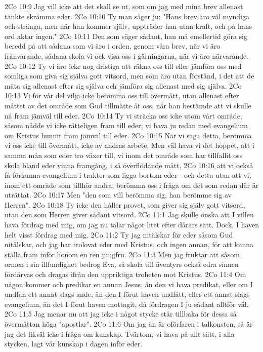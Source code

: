 2Co 10:9  Jag vill icke att det skall se ut, som om jag med mina brev allenast tänkte skrämma eder.
2Co 10:10  Ty man säger ju: "Hans brev äro väl myndiga och stränga, men när han kommer själv, uppträder han utan kraft, och på hans ord aktar ingen."
2Co 10:11  Den som säger sådant, han må emellertid göra sig beredd på att sådana som vi äro i orden, genom våra brev, när vi äro frånvarande, sådana skola vi ock visa oss i gärningarna, när vi äro närvarande.
2Co 10:12  Ty vi äro icke nog dristiga att räkna oss till eller jämföra oss med somliga som giva sig själva gott vitsord, men som äro utan förstånd, i det att de mäta sig allenast efter sig själva och jämföra sig allenast med sig själva.
2Co 10:13  Vi för vår del vilja icke berömma oss till övermått, utan allenast efter måttet av det område som Gud tillmätte åt oss, när han bestämde att vi skulle nå fram jämväl till eder.
2Co 10:14  Ty vi sträcka oss icke utom vårt område, såsom nådde vi icke rätteligen fram till eder; vi hava ju redan med evangelium om Kristus hunnit fram jämväl till eder.
2Co 10:15  När vi säga detta, berömma vi oss icke till övermått, icke av andras arbete. Men väl hava vi det hoppet, att i samma mån som eder tro växer till, vi inom det område som har tillfallit oss skola bland eder vinna framgång, i så överflödande mått,
2Co 10:16  att vi också få förkunna evangelium i trakter som ligga bortom eder - och detta utan att vi, inom ett område som tillhör andra, berömma oss i fråga om det som redan där är uträttat.
2Co 10:17  Men "den som vill berömma sig, han berömme sig av Herren".
2Co 10:18  Ty icke den håller provet, som giver sig själv gott vitsord, utan den som Herren giver sådant vitsord.
2Co 11:1  Jag skulle önska att I villen hava fördrag med mig, om jag nu talar något litet efter dårars sätt. Dock, I haven helt visst fördrag med mig.
2Co 11:2  Ty jag nitälskar för eder såsom Gud nitälskar, och jag har trolovat eder med Kristus, och ingen annan, för att kunna ställa fram inför honom en ren jungfru.
2Co 11:3  Men jag fruktar att såsom ormen i sin illfundighet bedrog Eva, så skola till äventyrs också edra sinnen fördärvas och dragas ifrån den uppriktiga troheten mot Kristus.
2Co 11:4  Om någon kommer och predikar en annan Jesus, än den vi hava predikat, eller om I undfån ett annat slags ande, än den I förut haven undfått, eller ett annat slags evangelium, än det I förut haven mottagit, då fördragen I ju sådant alltför väl.
2Co 11:5  Jag menar nu att jag icke i något stycke står tillbaka för dessa så övermåttan höga "apostlar".
2Co 11:6  Om jag än är oförfaren i talkonsten, så är jag det likväl icke i fråga om kunskap. Tvärtom, vi hava på allt sätt, i alla stycken, lagt vår kunskap i dagen inför eder.
